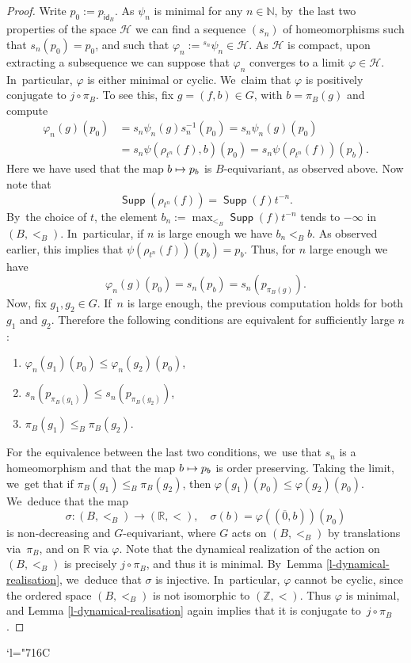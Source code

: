 \documentclass[JEP,XML,SOM,Unicode,NoFloatCountersInSection,published]{cedram}
\newcommand{\Changelback}{\mathcode`l="716C}
\def\mto{\mathchoice{\longmapsto}{\mapsto}{\mapsto}{\mapsto}}
\theoremstyle{definition}
\DeclareMathOperator{\id}{\mathsf{id}}
\DeclareMathOperator{\supp}{\mathsf{Supp}}
\newcommand{\R}{\mathbb{R}}
\newcommand{\N}{\mathbb N}
\newcommand{\Z}{\mathbb Z}
\begin{document}
\begin{proof}
Write $p_0:=p_{\id_B}$. As $\psi_n$ is minimal for any $n\in \N$, by~the last two properties of the space $\mathscr{H}$ we can find a sequence $(s_n)$ of homeomorphisms such that $s_n(p_{0})=p_{0}$, and such that $\varphi_n:={}^{s_n}\psi_n\in \mathscr{H}$. As $\mathscr{H}$ is compact, upon extracting a subsequence we can suppose that $\varphi_n$ converges to a limit $\varphi\in \mathscr{H}$. In~particular, $\varphi$ is either minimal or cyclic. We~claim that $\varphi$ is positively conjugate to $j\circ \pi_B$. To see this, fix $g=(f, b) \in G$, with $b=\pi_B(g)$ and compute
\begin{align*}
\varphi_n(g)(p_0)&=s_n \psi_n(g) s_n^{-1} (p_0)=s_n\psi_n(g)(p_0)\\&=s_n\psi(\rho_{t^n}(f), b)(p_0)=s_n\psi(\rho_{t^n}(f)) (p_b).\end{align*}
Here we have used that the map $b\mto p_b$ is $B$-equivariant, as observed above. Now note that
\[
\supp(\rho_{t^n}(f))=\supp(f)t^{-n}.
\]
By~the choice of $t$, the element $b_n:=\max_{<_B}\supp(f)t^{-n}$ tends to $-\infty$ in $(B, <_B)$. In~particular, if $n$ is large enough we have $b_n<_Bb$. As observed earlier, this implies that $\psi(\rho_{t^n} (f))(p_b)=p_b$. Thus, for $n$ large enough we have
\[\varphi_n(g)(p_0)=s_n(p_b)=s_n(p_{\pi_B(g)}).
\]
Now, fix $g_1, g_2\in G$. If~$n$ is large enough, the previous computation holds for both $g_1$ and $g_2$. Therefore the following conditions are equivalent for sufficiently large $n$:
\begin{enumerate}
\item $\varphi_n(g_1)(p_0)\le \varphi_n(g_2)(p_0)$,
\item $s_n(p_{\pi_B(g_1)})\le s_n(p_{\pi_B(g_2)})$,
\item $\pi_B(g_1) \le _B \pi_B(g_2).$
\end{enumerate}
For the equivalence between the last two conditions, we~use that $s_n$ is a homeomorphism and that the map $b\mto p_b$ is order preserving.
Taking the limit, we~get that if $\pi_B(g_1) \le_B \pi_B(g_2)$, then $\varphi(g_1)(p_0)\le \varphi(g_2)(p_0)$. We~deduce that the map
\[
\sigma\colon (B, <_B)\to (\R, <),\quad\sigma(b)=\varphi((\overline{0}, b))(p_0)
\]
is non-decreasing and $G$-equivariant, where $G$ acts on $(B, <_B)$ by translations via~$\pi_B$, and on $\R$ via $\varphi$. Note that the dynamical realization of the action on $(B, <_B)$ is precisely $j\circ \pi_B$, and thus it is minimal. By~Lemma \ref{l-dynamical-realisation}, we~deduce that $\sigma$ is injective. In~particular, $\varphi$ cannot be cyclic, since the ordered space $(B, <_B)$ is not isomorphic to $(\Z, <)$. Thus $\varphi$ is minimal, and Lemma \ref{l-dynamical-realisation} again implies that it is conjugate to~$j\circ \pi_B$.
\end{proof}

\Changelback

\backmatter


\end{document}
